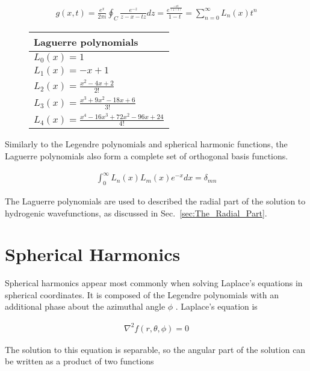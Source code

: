         \begin{align}
            g(x, t) = \frac{e^x}{2\pi i} \oint_C \frac{e^{-z}}{z - x - tz} dz = \frac{e^{\frac{-xt}{(1 - t)}}}{1 - t} = \sum_{n = 0}^\infty L_n(x) t^n
        \end{align}

        \begin{figure}
            \centering 
            \begin{tabular}{l}
                Laguerre polynomials\\
                \hline 
                $L_0(x) = 1$\\
                $L_1(x) = -x + 1$\\
                $L_2(x) = \frac{x^2 - 4x + 2}{2!}$\\
                $L_3(x) = \frac{x^3 + 9x^2 - 18x + 6}{3!}$\\
                $L_4(x) = \frac{x^4 - 16x^3 + 72x^2 - 96x + 24}{4!}$\\
                \hline
            \end{tabular}
        \end{figure}

        \noindent Similarly to the Legendre polynomials and spherical harmonic functions, the Laguerre polynomials also form a complete set of orthogonal basis functions.

        \begin{align}
            \int_0^\infty L_n(x) L_m(x) e^{-x} dx = \delta_{m n}
        \end{align}

        \noindent The Laguerre polynomials are used to described the radial part of the solution to hydrogenic wavefunctions, as discussed in Sec.~\ref{sec:The_Radial_Part}. 
        \section{Spherical Harmonics} \label{sec:Spherical_Harmonics}
        Spherical harmonics appear most commonly when solving Laplace's equations in spherical coordinates. It is composed of the Legendre polynomials with an additional phase about the azimuthal angle $\phi$ \cite{Riley_Hobson_Bence_2006}. Laplace's equation is 

        \begin{align}
            \nabla^2 f(r, \theta, \phi) = 0
        \end{align}

        \noindent The solution to this equation is separable, so the angular part of the solution can be written as a product of two functions 

